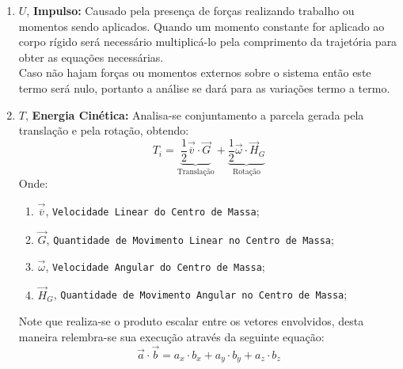 \documentclass{article}
\begin{document}
                \begin{enumerate}[rightmargin = \leftmargin]
                    \item $U$, \textbf{Impulso:} Causado pela presença de forças realizando trabalho ou momentos sendo aplicados. Quando um momento constante for aplicado ao corpo rígido será necessário multiplicá-lo pela comprimento da trajetória para obter as equações necessárias.\\
                    Caso não hajam forças ou momentos externos sobre o sistema então este termo será nulo, portanto a análise se dará para as variações termo a termo.

                    \item $T$, \textbf{Energia Cinética:} Analisa-se conjuntamento a parcela gerada pela translação e pela rotação, obtendo:
                        \begin{equation}
                            \boxed{
                                T_{i} = 
                                \underbrace{
                                    \frac{1}{2} \vec{\overline{v}}\cdot\vec{G}
                                }_{\text{Translação}} + 
                                \underbrace{
                                    \frac{1}{2}\vec{\omega}\cdot\vec{H}_{G}
                                }_{\text{Rotação}}
                            }
                        \end{equation}
                    Onde:
                        \begin{enumerate}[rightmargin = \leftmargin, noitemsep]
                            \item $\vec{\overline{v}}$, \texttt{Velocidade Linear do Centro de Massa};

                            \item $\vec{G}$, \texttt{Quantidade de Movimento Linear no Centro de Massa}; \vspace{5mm}

                            \item $\vec{\omega}$, \texttt{Velocidade Angular do Centro de Massa};

                            \item $\vec{H}_{G}$, \texttt{Quantidade de Movimento Angular no Centro de Massa};
                        \end{enumerate}
                    Note que realiza-se o produto escalar entre os vetores envolvidos, desta maneira relembra-se sua execução através da seguinte equação:
                        \begin{equation}
                            \boxed{
                                \vec{a} \cdot \vec{b} = 
                                a_{x} \cdot b_{x} + 
                                a_{y} \cdot b_{y} + 
                                a_{z} \cdot b_{z}
                            }
                        \end{equation}


\end{enumerate}
\end{document}
